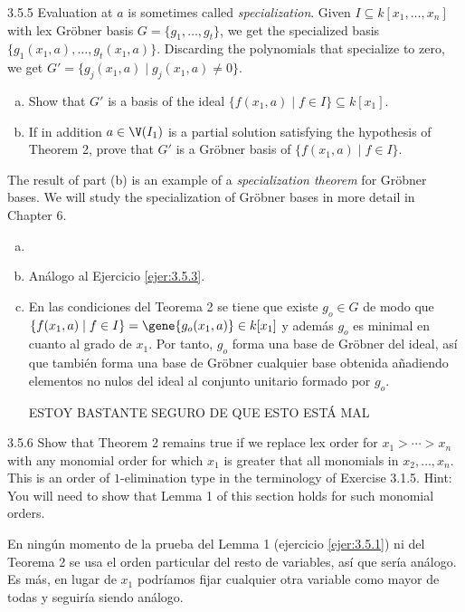 \documentclass[twoside]{article}
\begin{document}
\begin{ejercicio}{3.5.5}
Evaluation at $a$ is sometimes called \emph{specialization}.
Given $I \subseteq k[x_1,\dots,x_n]$ with lex Gröbner basis $G = \{g_1,\dots,g_t\}$, we get the specialized basis $\{g_1(x_1,a),\dots,g_t(x_1,a)\}$.
Discarding the polynomials that specialize to zero, we get $G' = \{g_j(x_1,a) \mid g_j(x_1,a) \neq 0\}$.
\begin{enumerate}[a.]
\item Show that $G'$ is a basis of the ideal $\{f(x_1,a) \mid f \in I\} \subseteq k[x_1]$.
\item If in addition $a \in \V(I_1)$ is a partial solution satisfying the hypothesis of Theorem 2, prove that $G'$ is a Gröbner basis of $\{f(x_1,a) \mid f \in I\}$.
\end{enumerate}
The result of part (b) is an example of a \emph{specialization theorem} for Gröbner bases.
We will study the specialization of Gröbner bases in more detail in Chapter 6.
\end{ejercicio}
\begin{solucion}
\begin{enumerate}[a.]
\item[]
\item Análogo al Ejercicio \ref{ejer:3.5.3}.
\item En las condiciones del Teorema 2 se tiene que existe $g_o\in G$ de modo que $\{f(x_1,a) \mid f \in I\}=\gene{g_o(x_1,a)}\in k[x_1]$ y además $g_o$ es minimal en cuanto al grado de $x_1$. Por tanto, $g_o$ forma una base de Gröbner del ideal, así que también forma una base de Gröbner cualquier base obtenida añadiendo elementos no nulos del ideal al conjunto unitario formado por $g_o$. 

ESTOY BASTANTE SEGURO DE QUE ESTO ESTÁ MAL
\end{enumerate}
\end{solucion}
\newpage

\begin{ejercicio}{3.5.6}
Show that Theorem 2 remains true if we replace lex order for $x_1 > \cdots > x_n$ with any monomial order for which $x_1$ is greater that all monomials in $x_2,\dots,x_n$.
This is an order of $1$-elimination type in the terminology of Exercise 3.1.5.
Hint: You will need to show that Lemma 1 of this section holds for such monomial orders.
\end{ejercicio}
\begin{solucion}
En ningún momento de la prueba del Lemma 1 (ejercicio \ref{ejer:3.5.1}) ni del Teorema 2 se usa el orden particular del resto de variables, así que sería análogo. Es más, en lugar de $x_1$ podríamos fijar cualquier otra variable como mayor de todas y seguiría siendo análogo.
\end{solucion}
\newpage
\end{document}
